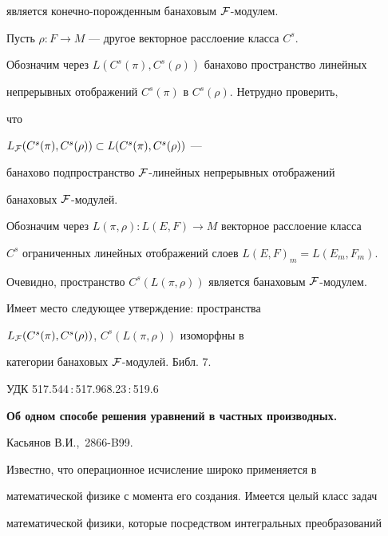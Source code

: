 является конечно-порожденным банаховым $\cal F$-модулем. 


 


Пусть $\rho:F\to M$ --- другое векторное расслоение класса $C^s$. 


Обозначим через $L(C^s(\pi),C^s(\rho))$ банахово пространство линейных 


непрерывных отображений $C^s(\pi)$ в $C^s(\rho)$. Нетрудно проверить, 


что 


$L_{\cal F}(C^s(\pi),C^s(\rho))\subset L(C^s(\pi),C^s(\rho))$ --- 


банахово подпространство $\cal F$-линейных непрерывных отображений 


банаховых $\cal F$-модулей. 


 


Обозначим через $L(\pi,\rho):L(E,F)\to M$ векторное расслоение класса 


$C^s$ ограниченных линейных отображений слоев $L(E,F)_m=L(E_m,F_m)$. 


Очевидно, пространство $C^s(L(\pi,\rho))$ является банаховым $\cal 


F$-модулем. 


 


Имеет место следующее утверждение: пространства 


$L_{\cal F}(C^s(\pi),C^s(\rho))$, $C^s(L(\pi,\rho))$ изоморфны в 


категории банаховых $\cal F$-модулей. Библ. 7. 


\bigskip 


 


 


{\hfill {УДК 517.544\,:\,517.968.23\,:\,519.6}} 


 


{\bf Об одном способе решения уравнений в частных производных. 


Касьянов В.И., \No\,2866-B99.} 


\medskip 


 


Известно, что операционное исчисление широко применяется в 


математической физике с момента его создания. Имеется целый класс задач 


математической физики, которые посредством интегральных преобразований 


